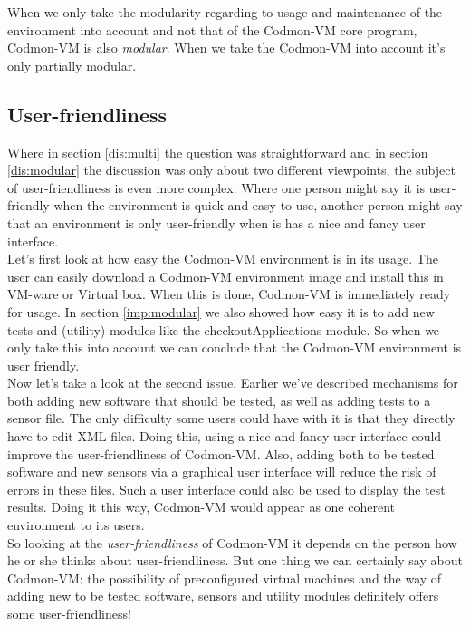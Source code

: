 \documentclass{article}
\newcommand{\project}{Codmon-VM}
\begin{document}
\noindent When we only take the modularity regarding to usage and maintenance of the environment into account and not that of the \project{} core program, \project{} is also \emph{modular}. 
When we take the \project{} into account it's only partially modular.\\

\subsection{User-friendliness}
\label{dis:user}
Where in section \ref{dis:multi} the question was straightforward and in section \ref{dis:modular} the discussion was only about two different viewpoints, the subject of user-friendliness is even more complex. 
Where one person might say it is user-friendly when the environment is quick and easy to use, another person might say that an environment is only user-friendly when is has a nice and fancy user interface.\\

\noindent Let's first look at how easy the \project{} environment is in its usage. The user can easily download a \project{} environment image and install this in VM-ware or Virtual box. When this is done, 
\project{} is immediately ready for usage. In section \ref{imp:modular} we also showed how easy it is to add new tests and (utility) modules like the checkoutApplications module. So when we only take this into 
account we can conclude that the \project{} environment is user friendly.\\

\noindent Now let's take a look at the second issue. Earlier we've described mechanisms for both adding new software that should be tested, as well as adding tests to a sensor file. The only difficulty 
some users could have with it is that they directly have to edit XML files. Doing this, using a nice and fancy user interface could improve the user-friendliness of \project{}. Also, adding both to be 
tested software and new sensors via a graphical user interface will reduce the risk of errors in these files. Such a user interface could also be used to display the test results. Doing it this way, 
\project{} would appear as one coherent environment to its users.\\

\noindent So looking at the \emph{user-friendliness} of \project{} it depends on the person how he or she thinks about user-friendliness. But one thing we can certainly say about \project{}: the possibility of 
preconfigured virtual machines and the way of adding new to be tested software, sensors and utility modules definitely offers some user-friendliness!
\end{document}
